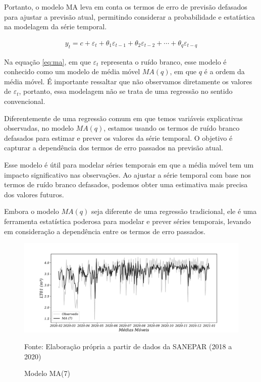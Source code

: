 Portanto, o modelo MA leva em conta os termos de erro de previsão defasados para ajustar a previsão atual, permitindo considerar a probabilidade e estatística na modelagem da série temporal.


\begin{eqnarray}
	y_t=c+\varepsilon_t+\theta_1 \varepsilon_{t-1}+\theta_2 \varepsilon_{t-2}+\cdots+\theta_q \varepsilon_{t-q}\label{eq:ma}
\end{eqnarray}

Na equação \eqref{eq:ma}, em que $\varepsilon_t$ representa o ruído branco, esse modelo é conhecido como um modelo de média móvel $MA(q)$, em que $q$ é a ordem da média móvel. É importante ressaltar que não observamos diretamente os valores de $\varepsilon_t$, portanto, essa modelagem não se trata de uma regressão no sentido convencional.

Diferentemente de uma regressão comum em que temos variáveis explicativas observadas, no modelo $MA(q)$, estamos usando os termos de ruído branco defasados para estimar e prever os valores da série temporal. O objetivo é capturar a dependência dos termos de erro passados na previsão atual.

Esse modelo é útil para modelar séries temporais em que a média móvel tem um impacto significativo nas observações. Ao ajustar a série temporal com base nos termos de ruído branco defasados, podemos obter uma estimativa mais precisa dos valores futuros.

Embora o modelo $MA(q)$ seja diferente de uma regressão tradicional, ele é uma ferramenta estatística poderosa para modelar e prever séries temporais, levando em consideração a dependência entre os termos de erro passados.

\begin{figure}[H]
	\centering
	\caption{Modelo MA(7) }
	\label{fig:1-ma}
	\includegraphics[width=0.9\linewidth]{Modelos/Figuras/0-MA}
	
	Fonte: Elaboração própria a partir de dados da SANEPAR (2018 a 2020)
\end{figure}

